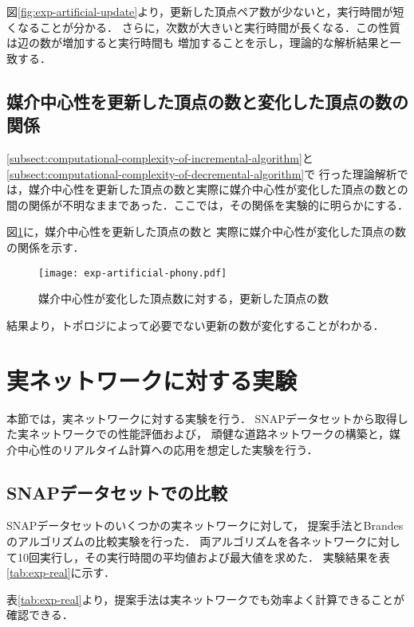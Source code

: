 図\ref{fig:exp-artificial-update}より，更新した頂点ペア数が少ないと，実行時間が短くなることが分かる．
さらに，次数が大きいと実行時間が長くなる．この性質は辺の数が増加すると実行時間も
増加することを示し，理論的な解析結果と一致する．

\subsection{媒介中心性を更新した頂点の数と変化した頂点の数の関係}

\ref{subsect:computational-complexity-of-incremental-algorithm}と
\ref{subsect:computational-complexity-of-decremental-algorithm}で
行った理論解析では，媒介中心性を更新した頂点の数と実際に媒介中心性が変化した頂点の数との
間の関係が不明なままであった．ここでは，その関係を実験的に明らかにする．

図\ref{fig:exp-artificial-phony}に，媒介中心性を更新した頂点の数と
実際に媒介中心性が変化した頂点の数の関係を示す．

\begin{figure}[tb]
  \centering
  \texttt{[image: exp-artificial-phony.pdf]}
  \caption{媒介中心性が変化した頂点数に対する，更新した頂点の数}
  \label{fig:exp-artificial-phony}
\end{figure}

結果より，トポロジによって必要でない更新の数が変化することがわかる．

\section{実ネットワークに対する実験}
\label{sect:exp-realnet}

本節では，実ネットワークに対する実験を行う．
SNAPデータセット\cite{Leskovec2016}から取得した実ネットワークでの性能評価および，
頑健な道路ネットワークの構築と，媒介中心性のリアルタイム計算への応用を想定した実験を行う．

\subsection{SNAPデータセットでの比較}
\label{subsect:exp-real}

SNAPデータセットのいくつかの実ネットワークに対して，
提案手法とBrandesのアルゴリズムの比較実験を行った．
両アルゴリズムを各ネットワークに対して10回実行し，その実行時間の平均値および最大値を求めた．
実験結果を表\ref{tab:exp-real}に示す．



表\ref{tab:exp-real}より，提案手法は実ネットワークでも効率よく計算できることが確認できる．

